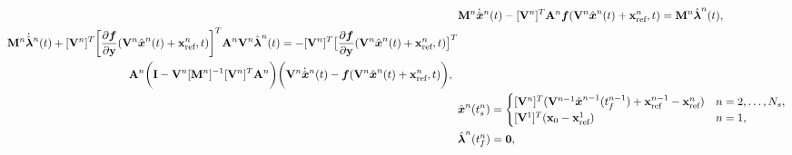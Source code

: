 \begin{comment}
\adjointArgnt{n} &: t \mapsto \genstateDotArg{n}{t}  -  \mass^{-1} \basisspace^T \stweightingMatArgt{n}{t}\velocity(\veloargsromn) ,\\
&: [\timeStartArg{n},\timeEndArg{n}] \rightarrow \RR{K} ,
\end{split}
\end{equation}
where
$\massArgnt{n} \equiv \basisspace^T \stweightingMatArgt{n}{t} \basisspace$ is the
mass matrix,
we can manipulate the system~\eqref{eq:clspg_2ord} (see
Appendix~\ref{appendix:vector_calc}) to obtain a coupled forward-backward
system for $t \in  [\timeStartArg{n},\timeEndArg{n}]$,
\end{comment}
\begin{align}\label{eq:lspg_continuous} 
&\massArg{n}   \genstateDotArg{n}{t}  -  [\basisspaceArg{n}]^T
\stweightingMatArgt{n}{t} \velocity(\veloargsromn) =  \massArg{n} \adjointArg{n}{t} , \\
\begin{split}
 &\massArg{n}  \adjointDotArg{n}{t}  + [\basisspaceArg{n}]^T \bigg[\frac{\partial
\velocity}{\partial \stateyDiscrete} (\veloargsromn) \bigg]^T \stweightingMatArgt{n}{t} \basisspaceArg{n}
 \adjointArg{n}{t} = -[\basisspaceArg{n}]^T \big[
\frac{\partial \velocity}{\partial \stateyDiscrete}(\veloargsromn) \big]^T \\& \hspace{1.5 in} \stweightingMatArgt{n}{t} \bigg( \mathbf{I} -
\basisspaceArg{n} [\massArg{n}]^{-1} [\basisspaceArg{n}]^T \stweightingMatArgt{n}{t} \bigg)
 \bigg( \basisspaceArg{n} \genstateDotArg{n}{t} -
\velocity(\veloargsromn) \bigg), \label{eq:lspg_adjoint}
\end{split}
 \\ &
\genstateArg{n}{\timeStartArg{n}} = \begin{cases}
\spatialIC & n=2,\ldots,\nslabs, \label{eq:lspg_bcs1}\\
\genstateICOne & n=1, \end{cases}\\ &
\adjointArg{n}{\timeEndArg{n}} = \boldsymbol 0, \label{eq:lspg_bcs} 
\end{align}
